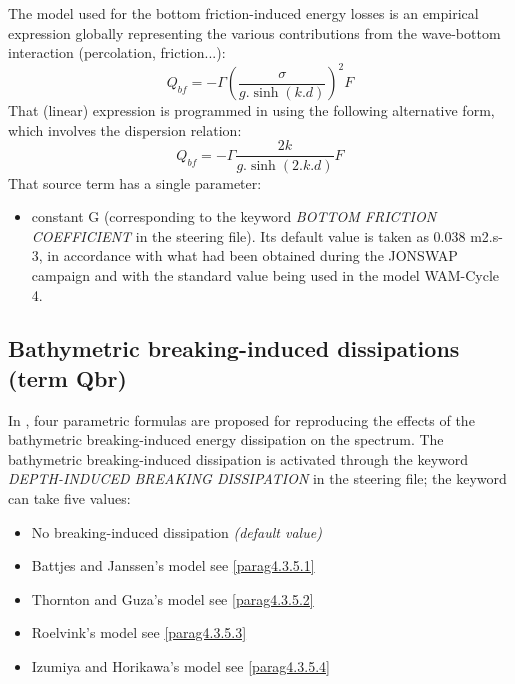 The model used for the bottom friction-induced energy losses is an empirical expression globally representing the various contributions from the wave-bottom interaction (percolation, friction...):
\begin{equation} \label{GrindEQ__4_42_}
Q_{bf} =-\Gamma \left(\frac{\sigma }{g.\sinh \left(k.d\right)} \right)^{2} F
\end{equation}
That (linear) expression is programmed in \tomawac using the following alternative form, which involves the dispersion relation:
\begin{equation} \label{GrindEQ__4_43_}
Q_{bf} =-\Gamma \frac{2k}{g.\sinh \left(2.k.d\right)} F
\end{equation}
That source term has a single parameter:

\begin{itemize}
\item  constant G (corresponding to the keyword \textit{BOTTOM FRICTION COEFFICIENT} in the steering file). Its default value is taken as 0.038 m2.s-3, in accordance with what had been obtained during the JONSWAP campaign \cite{Hasselmann1973} and with the standard value being used in the model WAM-Cycle 4.
\end{itemize}

\subsection{ Bathymetric breaking-induced dissipations (term Qbr)}

 In \tomawac, four parametric formulas are proposed for reproducing the effects of the bathymetric breaking-induced energy dissipation on the spectrum. The bathymetric breaking-induced dissipation is activated through the keyword \textit{DEPTH-INDUCED BREAKING DISSIPATION} in the steering file; the keyword can take five values:

\begin{itemize}
\item  No breaking-induced dissipation \textit{(default value)}
\item  Battjes and Janssen's model \cite{Battjes1978} see \ref{parag4.3.5.1}
\item  Thornton and Guza's model \cite{Thornton1983} see \ref{parag4.3.5.2}
\item  Roelvink's model \cite{Roelvink1993} see \ref{parag4.3.5.3}
\item  Izumiya and Horikawa's model \cite{Izumiya1984} see \ref{parag4.3.5.4}
\end{itemize}

